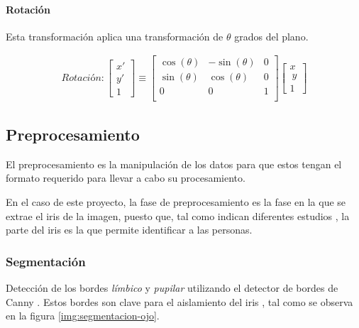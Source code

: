 \paragraph{Rotación}

Esta transformación aplica una transformación de $\theta$ grados del plano.



\begin{gather}
	Rotación:
	\begin{bmatrix} x' \\ y' \\ 1 \end{bmatrix}
	\equiv
	 \begin{bmatrix}
	  \cos(\theta) &-\sin(\theta) & 0 \\
	  \sin(\theta) & \cos(\theta) & 0 \\
	  0 & 0 & 1 \\
	  \end{bmatrix}
	  \begin{bmatrix} x \\\ y \\ 1 \end{bmatrix}
\end{gather}


\subsection{Preprocesamiento}

El preprocesamiento es la manipulación de los datos para que estos tengan el formato requerido para llevar a cabo su procesamiento.

En el caso de este proyecto, la fase de preprocesamiento es la fase en la que se extrae el iris de la imagen, puesto que, tal como indican diferentes estudios \cite{tfg_iris_2020} \cite{abdullah_iris_2015} \cite{malgheet_iris_2021} \cite{boyd_post-mortem_2020} \cite{liu_efficient_2021} \cite{szymkowski_iris-based_2021} \cite{lozej_end--end_2018}, la parte del iris es la que 
permite identificar a las personas.

\subsubsection{Segmentación}

Detección de los bordes \textit{límbico} y \textit{pupilar} utilizando el detector de bordes de Canny \cite{4767851}. Estos bordes son clave para el aislamiento del iris \cite{tfg_iris_2020}, tal como se observa en la figura \ref{img:segmentacion-ojo}.

